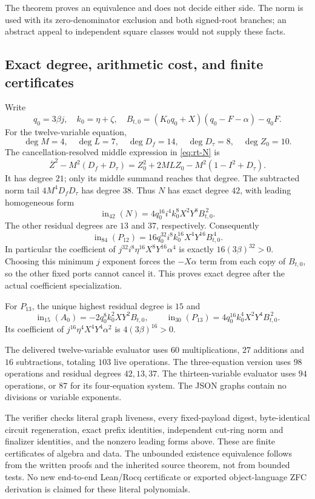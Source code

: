 The theorem proves an equivalence and does not decide either side.
The norm is used with its zero-denominator exclusion and both signed-root
branches; an abstract appeal to independent square classes would not
supply these facts.

\subsection{Exact degree, arithmetic cost, and finite certificates}

Write
\[
 q_0=3\beta j,\quad k_0=\eta+\zeta,\quad
 B_{t,0}=(K_0q_0+X)(q_0-F-\alpha)-q_0F.
\]
For the twelve-variable equation,
\[
 \deg M=4,\quad \deg L=7,\quad \deg D_f=14,\quad
 \deg D_\tau=8,\quad \deg Z_0=10.
\]
The cancellation-resolved middle expression in \eqref{eq:rt-N} is
\begin{equation}
 \overline Z^2-M^2(D_f+D_\tau)
 =Z_0^2+2MLZ_0-M^2(1-I^2+D_\tau).\label{eq:rt-centeridentity}
\end{equation}
It has degree $21$; only its middle summand reaches that degree.
The subtracted norm tail $4M^4D_fD_\tau$ has degree $38$.  Thus $N$ has
exact degree $42$, with leading homogeneous form
\[
 \operatorname{in}_{42}(N)
 =4q_0^{16}i^4k_0^8X^2Y^8B_{t,0}^{\,2}.
\]
The other residual degrees are $13$ and $37$, respectively.  Consequently
\begin{equation}
 \operatorname{in}_{84}(P_{12})
 =16q_0^{32}i^8k_0^{16}X^4Y^{16}B_{t,0}^{\,4}.
 \label{eq:rt-leading84}
\end{equation}
In particular the coefficient of
$j^{32}i^8\eta^{16}X^8Y^{16}\alpha^4$ is exactly
$16(3\beta)^{32}>0$.  Choosing this minimum $j$ exponent forces the
$-X\alpha$ term from each copy of $B_{t,0}$, so the other fixed ports
cannot cancel it.  This proves exact degree after the actual coefficient
specialization.

For $P_{13}$, the unique highest residual degree is $15$ and
\[
 \operatorname{in}_{15}(A_0)=-2q_0^8k_0^2XY^2B_{t,0},\qquad
 \operatorname{in}_{30}(P_{13})=4q_0^{16}k_0^4X^2Y^4B_{t,0}^{\,2}.
\]
Its coefficient of $j^{16}\eta^4X^4Y^4\alpha^2$ is
$4(3\beta)^{16}>0$.

The delivered twelve-variable evaluator uses $60$ multiplications,
$27$ additions and $16$ subtractions, totaling $103$ live operations.
The three-equation version uses $98$ operations and residual degrees
$42,13,37$.  The thirteen-variable evaluator uses $94$ operations,
or $87$ for its four-equation system.
The JSON graphs contain no divisions or variable exponents.

The verifier checks literal graph liveness, every fixed-payload digest,
byte-identical circuit regeneration, exact prefix identities,
independent cut-ring norm and finalizer identities, and the nonzero
leading forms above.  These are finite certificates of algebra and data.
The unbounded existence equivalence follows from the written proofs
and the inherited source theorem, not from bounded tests.  No new
end-to-end Lean/Rocq certificate or exported object-language ZFC
derivation is claimed for these literal polynomials.
